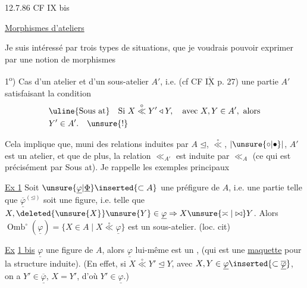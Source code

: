 12.7.86 \hfill CF IX bis

\uline{Morphismes d'ateliers}

Je suis intéressé par trois types de situations, que je voudrais pouvoir exprimer par une notion de morphismes

1\textsuperscript{o}) Cas d'un atelier  et d'un sous-atelier $A'$, i.e. (cf CF $\overline{\underline{\mathrm{IX}}}$ p. 27) une partie $A'$ satisfaisant la condition
\[
\begin{aligned}
&\text{\uline{Sous at}}\quad \text{Si }X\overset{\circ}{\ll}Y'\triangleleft Y,\quad\text{avec }X,Y\in A',\ \text{alors}\\
&Y'\in A'.\quad\unsure{!}
\end{aligned}
\]

Cela implique que, muni des relations induites par $A$ $\unlhd$, $\overset{\circ}{\ll}$, $|\unsure{\circ|\bullet}|$, $A'$ est un atelier, et que de plus, la relation $\ll_{A'}$ est induite par $\ll_A$ (ce qui est  précisément par Sous at). Je rappelle les exemples principaux

\uline{Ex 1} Soit \unsure{\textsuperscript{*}} $\unsure{\underline{\varphi}|\underline{\Phi}}\inserted{\subset A}$ une préfigure de $A$, i.e. une partie telle que $\overline{\underline{\varphi}}^{(\unlhd)}$ soit une figure, i.e. telle que $X,\deleted{\unsure{X}}\unsure{Y}\in\underline{\varphi}\Rightarrow X\unsure{\asymp|\bowtie}Y$. Alors $\operatorname{Omb}^{\circ}(\underline{\varphi})=\{X\in A\mid X\overset{\circ}{\ll}\underline{\varphi}\}$ est un sous-atelier. (loc. cit)

\uline{Ex} \uline{1 bis} $\underline{\varphi}$ une figure de $A$, alors $\underline{\varphi}$ lui-même\inserted{!} est un , (qui est une \uline{maquette} pour la structure induite). (En effet, si $X\overset{\circ}{\ll}Y'\unlhd Y$, avec $X,Y\in\underline{\varphi}\inserted{\subset\overline{\underline{\varphi}}}$, on a $Y'\in\overline{\underline{\varphi}}$,  $X=Y'$, d'où $Y'\in\underline{\varphi}$.)

